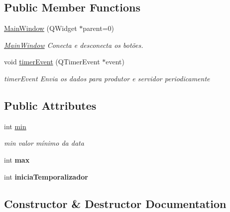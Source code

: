 \subsection*{Public Member Functions}
\begin{DoxyCompactItemize}
\item 
\mbox{\hyperlink{class_main_window_a8b244be8b7b7db1b08de2a2acb9409db}{Main\+Window}} (Q\+Widget $\ast$parent=0)
\begin{DoxyCompactList}\small\item\em \mbox{\hyperlink{class_main_window}{Main\+Window}} Conecta e desconecta os botões. \end{DoxyCompactList}\item 
void \mbox{\hyperlink{class_main_window_aaa425b1554af3c1f58cc70b4815082ae}{timer\+Event}} (Q\+Timer\+Event $\ast$event)
\begin{DoxyCompactList}\small\item\em timer\+Event Envia os dados para produtor e servidor periodicamente \end{DoxyCompactList}\end{DoxyCompactItemize}
\subsection*{Public Attributes}
\begin{DoxyCompactItemize}
\item 
int \mbox{\hyperlink{class_main_window_a6532047b0bff225c214b39c58f474c76}{min}}
\begin{DoxyCompactList}\small\item\em min valor mínimo da data \end{DoxyCompactList}\item 
\mbox{\label{class_main_window_a14583b87c8e4e201c4818d8a574d5941}} 
int {\bfseries max}
\item 
\mbox{\label{class_main_window_aec1dc95faae431bc9dd08a126631994d}} 
int {\bfseries inicia\+Temporalizador}
\end{DoxyCompactItemize}


\subsection{Constructor \& Destructor Documentation}
\mbox{\label{class_main_window_a8b244be8b7b7db1b08de2a2acb9409db}} 
